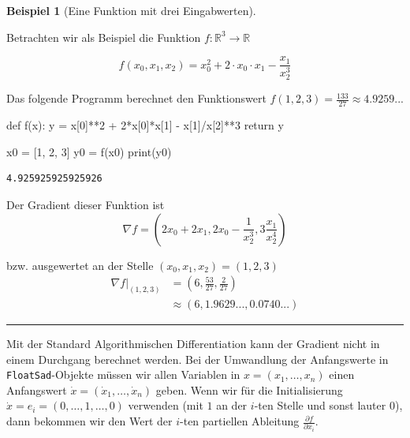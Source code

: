 \documentclass[
  a4paper,
  DIV=11]{scrreprt}
\newenvironment{Shaded}{\begin{snugshade}}{\end{snugshade}}
\newcommand{\BuiltInTok}[1]{\textcolor[rgb]{0.00,0.23,0.31}{#1}}
\newcommand{\ControlFlowTok}[1]{\textcolor[rgb]{0.00,0.23,0.31}{#1}}
\newcommand{\DecValTok}[1]{\textcolor[rgb]{0.68,0.00,0.00}{#1}}
\newcommand{\KeywordTok}[1]{\textcolor[rgb]{0.00,0.23,0.31}{#1}}
\newcommand{\NormalTok}[1]{\textcolor[rgb]{0.00,0.23,0.31}{#1}}
\newcommand{\OperatorTok}[1]{\textcolor[rgb]{0.37,0.37,0.37}{#1}}
\theoremstyle{definition}
\theoremstyle{definition}
\newtheorem{example}{Beispiel}[chapter]
\theoremstyle{remark}
\begin{document}
\begin{example}[Eine Funktion mit drei
Eingabwerten]\protect\hypertarget{exm-ExampleFunctionRnToR}{}\label{exm-ExampleFunctionRnToR}

Betrachten wir als Beispiel die Funktion
\(f : \mathbb{R}^3 \rightarrow \mathbb{R}\)

\[
f(x_0, x_1, x_2) = x_0^2 + 2\cdot x_0 \cdot x_1 - \frac{x_1}{x_2 ^3}
\]

Das folgende Programm berechnet den Funktionswert
\(f(1, 2, 3)=\frac{133}{27}\approx 4.9259...\)

\begin{Shaded}
\begin{Highlighting}[]
\KeywordTok{def}\NormalTok{ f(x):}
\NormalTok{    y }\OperatorTok{=}\NormalTok{ x[}\DecValTok{0}\NormalTok{]}\OperatorTok{**}\DecValTok{2} \OperatorTok{+} \DecValTok{2}\OperatorTok{*}\NormalTok{x[}\DecValTok{0}\NormalTok{]}\OperatorTok{*}\NormalTok{x[}\DecValTok{1}\NormalTok{] }\OperatorTok{{-}}\NormalTok{ x[}\DecValTok{1}\NormalTok{]}\OperatorTok{/}\NormalTok{x[}\DecValTok{2}\NormalTok{]}\OperatorTok{**}\DecValTok{3}
    \ControlFlowTok{return}\NormalTok{ y}

\NormalTok{x0 }\OperatorTok{=}\NormalTok{ [}\DecValTok{1}\NormalTok{, }\DecValTok{2}\NormalTok{, }\DecValTok{3}\NormalTok{]}
\NormalTok{y0 }\OperatorTok{=}\NormalTok{ f(x0)}
\BuiltInTok{print}\NormalTok{(y0)}
\end{Highlighting}
\end{Shaded}

\begin{verbatim}
4.925925925925926
\end{verbatim}

Der Gradient dieser Funktion ist \[
\nabla f = \left( 2x_0+2x_1, 2x_0 - \frac{1}{x_2^3}, 3\frac{x_1}{x_2^4} \right)
\]

bzw. ausgewertet an der Stelle \((x_0, x_1, x_2) = (1, 2, 3)\) \[
\begin{align*}
\nabla f \vert _{(1, 2, 3)} &= \left( 6, \frac{53}{27}, \frac2{27} \right) \\
&\approx \left( 6, 1.9629..., 0.0740... \right)
\end{align*}
\]

\end{example}

\begin{center}\rule{0.5\linewidth}{0.5pt}\end{center}

Mit der Standard Algorithmischen Differentiation kann der Gradient nicht
in einem Durchgang berechnet werden. Bei der Umwandlung der Anfangswerte
in \texttt{FloatSad}-Objekte müssen wir allen Variablen in
\(x = (x_1, \ldots, x_n)\) einen Anfangswert
\(\dot{x} = (\dot x_1, \ldots, \dot x_n)\) geben. Wenn wir für die
Initialisierung \(\dot{x} = e_i = (0, \ldots, 1, \ldots, 0)\) verwenden
(mit \(1\) an der \(i\)-ten Stelle und sonst lauter \(0\)), dann
bekommen wir den Wert der \(i\)-ten partiellen Ableitung
\(\frac{\partial f}{\partial x_i}\).
\end{document}
